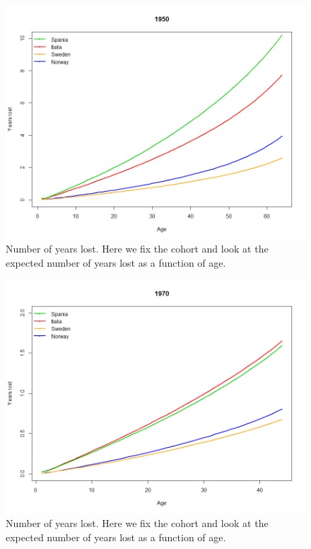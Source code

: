          
                         
              \begin{figure}[tbh]
             \centering
              \includegraphics[width=0.8\linewidth]{figures/antal_tapteAs_functionCohort_AllCountries1950.png}
              \caption{Number of years lost. Here we fix the cohort and look at the expected number of years lost as a function of age.}
              \label{fig:Number of years lost 1950}
            \end{figure}   
            
            
            
         
                         
              \begin{figure}[tbh]
             \centering
              \includegraphics[width=0.8\linewidth]{figures/antal_tapteAs_functionCohort_AllCountries1970.png}
              \caption{Number of years lost. Here we fix the cohort and look at the expected number of years lost as a function of age.}
              \label{fig:Number of years lost 1970}
            \end{figure}   
            
